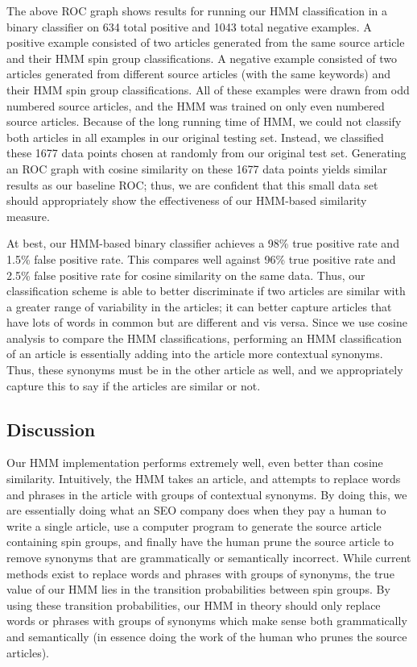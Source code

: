 \documentclass[11pt,letterpaper,oneside, titlepage]{scrartcl}
\begin{document}
The above ROC graph shows results for running our HMM classification in a binary classifier on 634 total positive and 1043 total negative examples. A positive example consisted of two articles generated from the same source article and their HMM spin group classifications. A negative example consisted of two articles generated from different source articles (with the same keywords) and their HMM spin group classifications. All of these examples were drawn from odd numbered source articles, and the HMM was trained on only even numbered source articles. Because of the long running time of HMM, we could not classify both articles in all examples in our original testing set. Instead, we classified these 1677 data points chosen at randomly from our original test set. Generating an ROC graph with cosine similarity on these 1677 data points yields similar results as our baseline ROC; thus, we are confident that this small data set should appropriately show the effectiveness of our HMM-based similarity measure.

At best, our HMM-based binary classifier achieves a 98\% true positive rate and 1.5\% false positive rate. This compares well against 96\% true positive rate and 2.5\% false positive rate for cosine similarity on the same data. Thus, our classification scheme is able to better discriminate if two articles are similar with a greater range of variability in the articles; it can better capture articles that have lots of words in common but are different and vis versa. Since we use cosine analysis to compare the HMM classifications, performing an HMM classification of an article is essentially adding into the article more contextual synonyms. Thus, these synonyms must be in the other article as well, and we appropriately capture this to say if the articles are similar or not.


\subsection{Discussion}

Our HMM implementation performs extremely well, even better than cosine similarity. Intuitively, the HMM takes an article, and attempts to replace words and phrases in the article with groups of contextual synonyms. By doing this, we are essentially doing what an SEO company does when they pay a human to write a single article, use a computer program to generate the source article containing spin groups, and finally have the human prune the source article to remove synonyms that are grammatically or semantically incorrect. While current methods exist to replace words and phrases with groups of synonyms, the true value of our HMM lies in the transition probabilities between spin groups. By using these transition probabilities, our HMM in theory should only replace words or phrases with groups of synonyms which make sense both grammatically and semantically (in essence doing the work of the human who prunes the source articles). 
\end{document}
